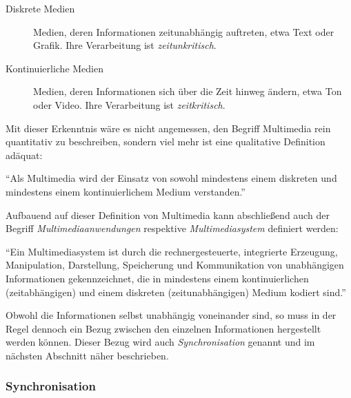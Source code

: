   \begin{description}
    \item[Diskrete Medien] Medien, deren Informationen zeitunabhängig auftreten, etwa Text oder Grafik. Ihre Verarbeitung ist \emph{zeitunkritisch}.
    \item[Kontinuierliche Medien] Medien, deren Informationen sich über die Zeit hinweg ändern, etwa Ton oder Video. Ihre Verarbeitung ist \emph{zeitkritisch}.
  \end{description}

  Mit dieser Erkenntnis wäre es nicht angemessen, den Begriff Multimedia rein quantitativ zu beschreiben, sondern viel mehr ist eine qualitative Definition adäquat:

  \begin{definition}[Multimedia]\label{def:multimedia}
    "`Als Multimedia wird der Einsatz von sowohl mindestens einem diskreten und mindestens einem kontinuierlichem Medium verstanden."' \emph{\citep[S. 14]{multimedia_technologie}}
  \end{definition}
  
  Aufbauend auf dieser Definition von Multimedia kann abschließend auch der Begriff \emph{Multimediaanwendungen} respektive \emph{Multimediasystem} definiert werden:

  \begin{definition}[Multimediasystem]\label{def:multimediasystem}
    "`Ein Multimediasystem ist durch die rechnergesteuerte, integrierte Erzeugung, Manipulation, Darstellung, Speicherung und Kommunikation von unabhängigen Informationen gekennzeichnet, die in mindestens einem kontinuierlichen (zeitabhängigen) und einem diskreten (zeitunabhängigen) Medium kodiert sind."' \emph{\citep[S. 13]{multimedia_technologie}}
  \end{definition}
  

  Obwohl die Informationen selbst unabhängig voneinander sind, so muss in der Regel dennoch ein Bezug zwischen den einzelnen Informationen hergestellt werden können. Dieser Bezug wird auch \emph{Synchronisation} genannt und im nächsten Abschnitt näher beschrieben.

\subsubsection{Synchronisation} %
\label{ssub:synchronisation}


